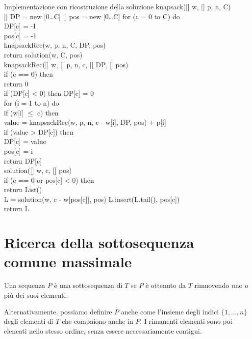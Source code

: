 \begin{minicode}{Implementazione con ricostruzione della soluzione}
\ind{} knapsack([] w, [] p,  n,  C)\\
    [] DP = new [0\dots C]\hfill{}
    [] pos = new [0\dots C]\hfill{}
    \indf for (c = 0 to C) do\\
        DP[c] = -1\\
        pos[c] = -1\\
    \indf knapsackRec(w, p, n, C, DP, pos)\\
    \indf return solution(w, C, pos)\\

\ind{} knapsackRec([] w, [] p,  n,  c,
[] DP, [] pos)\\
    \indf if (c == 0) then\\
        return 0\\
    \indf if (DP[c] < 0) then\hfill{}
        DP[c] = 0\\
        \indff for (i = 1 to n) do\\
            \indfff if (w[i] $\leq$ c) then\\
                 value = knapsackRec(w, p, n, c - w[i], DP, pos) + p[i]\\
                \indffff if (value > DP[c]) then\\
                    DP[c] = value\\
                    pos[c] = i\\
    \indf return DP[c]\\

\ind{} solution([] w,  c, [] pos)\\
    \indf if (c == 0 or pos[c] < 0) then\\
        return List()\\
    \indf{} L = solution(w, c - w[pos[c]], pos)\hfill{}
    \indf L.insert(L.tail(), pos[c])\\
    \indf return L
\end{minicode}

\section{Ricerca della sottosequenza comune massimale}
\begin{definition}[Sottosequenza]
    Una sequenza $P$ è una sottosequenza di $T$ se $P$ è ottenuto da $T$
    rimuovendo uno o più dei suoi elementi.
\end{definition}\noindent
Alternativamente, possiamo definire $P$ anche come l'insieme degli indici
$\{1,\dots,n\}$ degli elementi di $T$ che compaiono anche in $P$. I rimanenti
elementi sono poi elencati nello stesso ordine, senza essere necessariamente
contigui.

